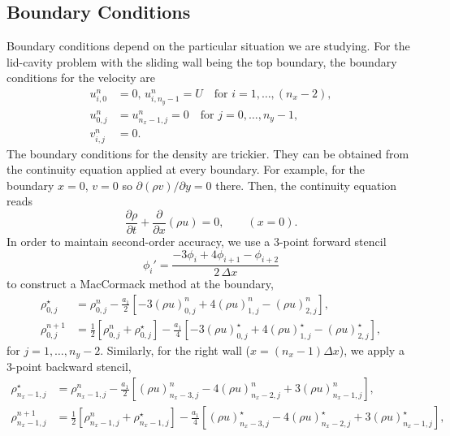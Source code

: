 \documentclass[11pt]{article}
\newcommand{\ind}[4]{{#1}^{#2}_{#3,#4}}
\begin{document}
\subsection{Boundary Conditions}

Boundary conditions depend on the particular situation we are studying. For the lid-cavity problem with the sliding wall being the top boundary, the boundary conditions for the velocity are
\begin{align}
\ind{u}{n}{i}{0} &= 0,\, \ind{u}{n}{i}{n_y-1} = U\quad\text{for }i = 1,\hdots,(n_x-2),\\
\ind{u}{n}{0}{j} &= \ind{u}{n}{n_x-1}{j} = 0\quad \text{for }j = 0,\hdots,n_y-1,\\
\ind{v}{n}{i}{j} &= 0.
\end{align}
The boundary conditions for the density are trickier. They can be obtained from the continuity equation applied at every boundary. For example, for the boundary $x = 0$, $v = 0$ so $\partial(\rho v)/\partial y = 0$ there. Then, the continuity equation reads
\begin{equation}
\frac{\partial \rho}{\partial t} + \frac{\partial}{\partial x}\left(\rho u\right) = 0,\qquad (x = 0).
\end{equation}
In order to maintain second-order accuracy, we use a 3-point forward stencil
\begin{equation}
\phi_i' = \frac{-3\phi_i + 4\phi_{i+1} - \phi_{i+2}}{2\,\Delta x}
\end{equation}
to construct a MacCormack method at the boundary,
\begin{align}
\ind{\rho}{\star}{0}{j} &= \ind{\rho}{n}{0}{j} 
- \frac{a_1}{2}\left[-3\ind{(\rho u)}{n}{0}{j} + 4\ind{(\rho u)}{n}{1}{j} - \ind{(\rho u)}{n}{2}{j}\right],\\
\ind{\rho}{n+1}{0}{j} &= \frac{1}{2}\left[ \ind{\rho}{n}{0}{j} + \ind{\rho}{\star}{0}{j} \right] 
- \frac{a_1}{4}\left[-3\ind{(\rho u)}{\star}{0}{j} + 4\ind{(\rho u)}{\star}{1}{j} - \ind{(\rho u)}{\star}{2}{j}\right],
\end{align}
for $j = 1,\hdots,n_y-2$. Similarly, for the right wall ($x = (n_x-1)\Delta x$), we apply a 3-point backward stencil,
\begin{align}
\ind{\rho}{\star}{n_x-1}{j} &= \ind{\rho}{n}{n_x-1}{j} 
- \frac{a_1}{2}\left[\ind{(\rho u)}{n}{n_x-3}{j} - 4\ind{(\rho u)}{n}{n_x-2}{j} + 3\ind{(\rho u)}{n}{n_x-1}{j}\right],\\
\ind{\rho}{n+1}{n_x-1}{j} &= \frac{1}{2}\left[ \ind{\rho}{n}{n_x-1}{j} + \ind{\rho}{\star}{n_x-1}{j} \right] 
- \frac{a_1}{4}\left[\ind{(\rho u)}{\star}{n_x-3}{j} - 4\ind{(\rho u)}{\star}{n_x-2}{j} + 3\ind{(\rho u)}{\star}{n_x-1}{j}\right],
\end{align}
\end{document}
